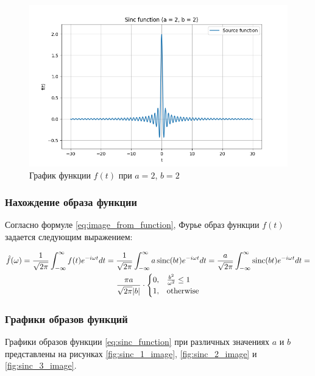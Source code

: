 \begin{figure}[ht!]
    \centering
    \includegraphics[width=\textwidth]{media/sinc_3.png}
    \caption{График функции $f(t)$ при $a = 2$, $b = 2$}
    \label{fig:sinc_3}
\end{figure}

\FloatBarrier
\subsubsection{Нахождение образа функции}
Согласно формуле \eqref{eq:image_from_function}, Фурье образ функции $f(t)$ задается следующим выражением:

\begin{multline}
    \hat{f}(\omega) = \frac{1}{\sqrt{2\pi}} \int_{-\infty}^{\infty} f(t) e^{-i\omega t} dt = \frac{1}{\sqrt{2\pi}} \int_{-\infty}^{\infty} a \operatorname{sinc}(bt) e^{-i\omega t} dt = \frac{a}{\sqrt{2\pi}} \int_{-\infty}^{\infty} \operatorname{sinc}(bt) e^{-i\omega t} dt = \\
    \frac{\pi a}{\sqrt{2\pi} |b|}\cdot \begin{cases} 0, & \frac{b^2}{\omega^2} \le 1 \\ 1, & \text{otherwise} \end{cases}
\end{multline}

\subsubsection{Графики образов функций}
Графики образов функции \eqref{eq:sinc_function} при различных значениях $a$ и $b$ представлены на рисунках \ref{fig:sinc_1_image}, \ref{fig:sinc_2_image} и \ref{fig:sinc_3_image}.

